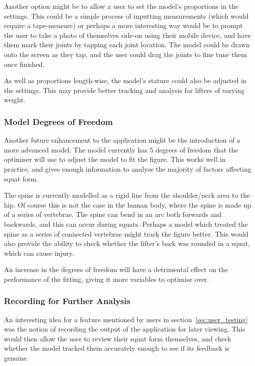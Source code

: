 Another option might be to allow a user to set the model's proportions in the settings. This could be a simple process of inputting measurements (which would require a tape-measure) or perhaps a more interesting way would be to prompt the user to take a photo of themselves side-on using their mobile device, and have them mark their joints by tapping each joint location. The model could be drawn onto the screen as they tap, and the user could drag the joints to fine tune them once finished.

As well as proportions length-wise, the model's stature could also be adjusted in the settings. This may provide better tracking and analysis for lifters of varying weight.

\subsubsection{Model Degrees of Freedom}

Another future enhancement to the application might be the introduction of a more advanced model. The model currently has 5 degrees of freedom that the optimiser will use to adjust the model to fit the figure. This works well in practice, and gives enough information to analyse the majority of factors affecting squat form.

The spine is currently modelled as a rigid line from the shoulder/neck area to the hip. Of course this is not the case in the human body, where the spine is made up of a series of vertebrae. The spine can bend in an arc both forwards and backwards, and this can occur during squats. Perhaps a model which treated the spine as a series of connected vertebrae might track the figure better. This would also provide the ability to check whether the lifter's back was rounded in a squat, which can cause injury.

An increase in the degrees of freedom will have a detrimental effect on the performance of the fitting, giving it more variables to optimise over.

\subsubsection{Recording for Further Analysis}

An interesting idea for a feature mentioned by users in section~\ref{sec:user_testing} was the notion of recording the output of the application for later viewing. This would then allow the user to review their squat form themselves, and check whether the model tracked them accurately enough to see if its feedback is genuine.

